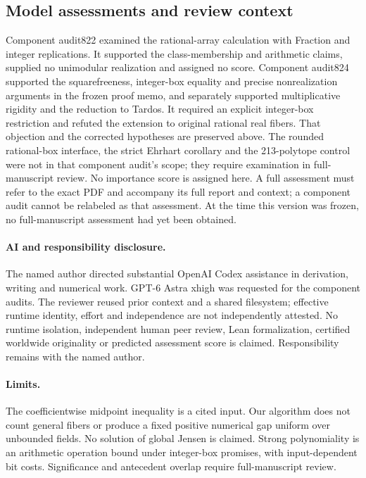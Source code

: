 \documentclass[11pt]{article}
\begin{document}
\subsection*{Model assessments and review context}
Component audit822 examined the rational-array calculation with Fraction and integer replications. It supported the class-membership and arithmetic claims, supplied no unimodular realization and assigned no score.
Component audit824 supported the squarefreeness, integer-box equality and precise nonrealization arguments in the frozen proof memo, and separately supported multiplicative rigidity and the reduction to Tardos. It required an explicit integer-box restriction and refuted the extension to original rational real fibers. That objection and the corrected hypotheses are preserved above. The rounded rational-box interface, the strict Ehrhart corollary and the 213-polytope control were not in that component audit's scope; they require examination in full-manuscript review.
No importance score is assigned here. A full assessment must refer to the exact PDF and accompany its full report and context; a component audit cannot be relabeled as that assessment. At the time this version was frozen, no full-manuscript assessment had yet been obtained.

\paragraph{AI and responsibility disclosure.}
The named author directed substantial OpenAI Codex assistance in derivation, writing and numerical work. GPT-6 Astra xhigh was requested for the component audits. The reviewer reused prior context and a shared filesystem; effective runtime identity, effort and independence are not independently attested. No runtime isolation, independent human peer review, Lean formalization, certified worldwide originality or predicted assessment score is claimed. Responsibility remains with the named author.

\paragraph{Limits.}
The coefficientwise midpoint inequality is a cited input. Our algorithm does not count general fibers or produce a fixed positive numerical gap uniform over unbounded fields. No solution of global Jensen is claimed. Strong polynomiality is an arithmetic operation bound under integer-box promises, with input-dependent bit costs. Significance and antecedent overlap require full-manuscript review.
\end{document}
